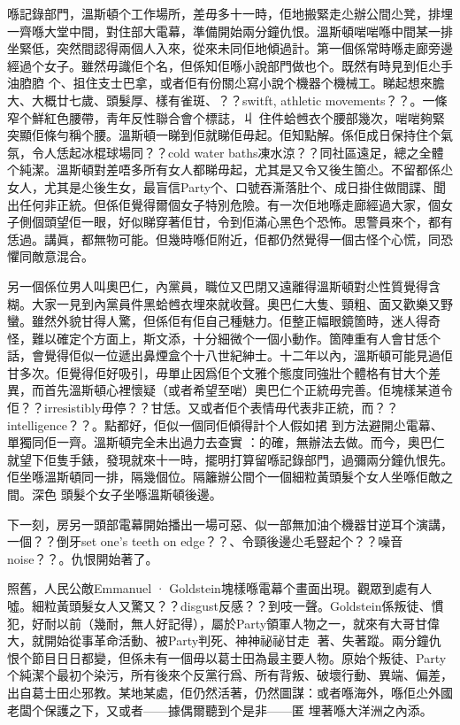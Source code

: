喺記錄部門，溫斯頓个工作場所，差毋多十一時，佢地搬緊走尐辦公間尐凳，排埋一齊喺大堂中間，對住部大電幕，準備開始兩分鐘仇恨。溫斯頓啱啱喺中間某一排坐緊低，突然間認得兩個人入來，從來未同佢地傾過計。第一個係常時喺走廊旁邊經過个女子。雖然毋識佢个名，但係知佢喺小說部門做也个。既然有時見到佢尐手油𦛚𦛚
个、抯住支士巴拿，或者佢有份關尐寫小說个機器个機械工。睇起想來膽大、大概廿七歲、頭髮厚、樣有雀斑、？？switft, athletic movements？？。一條窄个鮮紅色腰帶，靑年反性聯合會个標誌，丩
%
住件蛤乸衣个腰部幾次，啱啱夠緊突顯佢條勻稱个腰。溫斯頓一睇到佢就睇佢毋起。佢知點解。係佢成日保持住个氣氛，令人恁起冰棍球場同？？cold water baths凍水涼？？同社區遠足，總之全體个純潔。溫斯頓對差唔多所有女人都睇毋起，尤其是又令又後生箇尐。不留都係尐女人，尤其是尐後生女，最盲信Party个、口號吞澌落肚个、成日掛住做間諜、聞出任何非正統。但係佢覺得爾個女子特別危險。有一次佢地喺走廊經過大家，個女子側個頭望佢一眼，好似睇穿著佢甘，令到佢滿心黑色个恐怖。思警員來个，都有恁過。講眞，都無物可能。但幾時喺佢附近，佢都仍然覺得一個古怪个心慌，同恐懼同敵意混合。

另一個係位男人叫奧巴仁，內黨員，職位又巴閉又遠離得溫斯頓對尐性質覺得含糊。大家一見到內黨員件黑蛤乸衣埋來就收聲。奧巴仁大隻、頸粗、面又歡樂又野蠻。雖然外貌甘得人驚，但係佢有佢自己種魅力。佢整正幅眼鏡箇時，迷人得奇怪，難以確定个方面上，斯文添，十分細微个一個小動作。箇陣重有人會甘恁个話，會覺得佢似一位遞出鼻煙盒个十八世紀紳士。十二年以內，溫斯頓可能見過佢甘多次。佢覺得佢好吸引，毋單止因爲佢个文雅个態度同強壯个體格有甘大个差異，而首先溫斯頓心裡懷疑（或者希望至啱）奧巴仁个正統毋完善。佢塊樣某道令佢？？irresistibly毋停？？甘恁。又或者佢个表情毋代表非正統，而？？intelligence？？。點都好，佢似一個同佢傾得計个人假如捃
到方法避開尐電幕、單獨同佢一齊。溫斯頓完全未出過力去查實%
：的確，無辦法去做。而今，奧巴仁就望下佢隻手錶，發現就來十一時，擺明打算留喺記錄部門，過彌兩分鐘仇恨先。佢坐喺溫斯頓同一排，隔幾個位。隔籬辦公間个一個細粒黃頭髮个女人坐喺佢敵之間。深色%
頭髮个女子坐喺溫斯頓後邊。

下一刻，房另一頭部電幕開始播出一場可惡、似一部無加油个機器甘逆耳个演講，一個？？倒牙set one's teeth on edge？？、令頸後邊尐毛豎起个？？噪音noise？？。仇恨開始著了。

照舊，人民公敵Emmanuel · Goldstein塊樣喺電幕个畫面出現。觀眾到處有人噓。細粒黃頭髮女人又驚又？？disgust反感？？到吱一聲。Goldstein係叛徒、慣犯，好耐以前（幾耐，無人好記得），屬於Party領軍人物之一，就來有大哥甘偉大，就開始從事革命活動、被Party判死、神神祕祕甘走𠞉
著、失著蹤。兩分鐘仇恨个節目日日都變，但係未有一個毋以葛士田為最主要人物。原始个叛徒、Party个純潔个最初个染污，所有後來个反黨行爲、所有背叛、破壞行動、異端、偏差，出自葛士田尐邪教。某地某處，佢仍然活著，仍然圖謀：或者喺海外，喺佢尐外國老闆个保護之下，又或者——據偶爾聽到个是非——匿
埋著喺大洋洲之內添。

